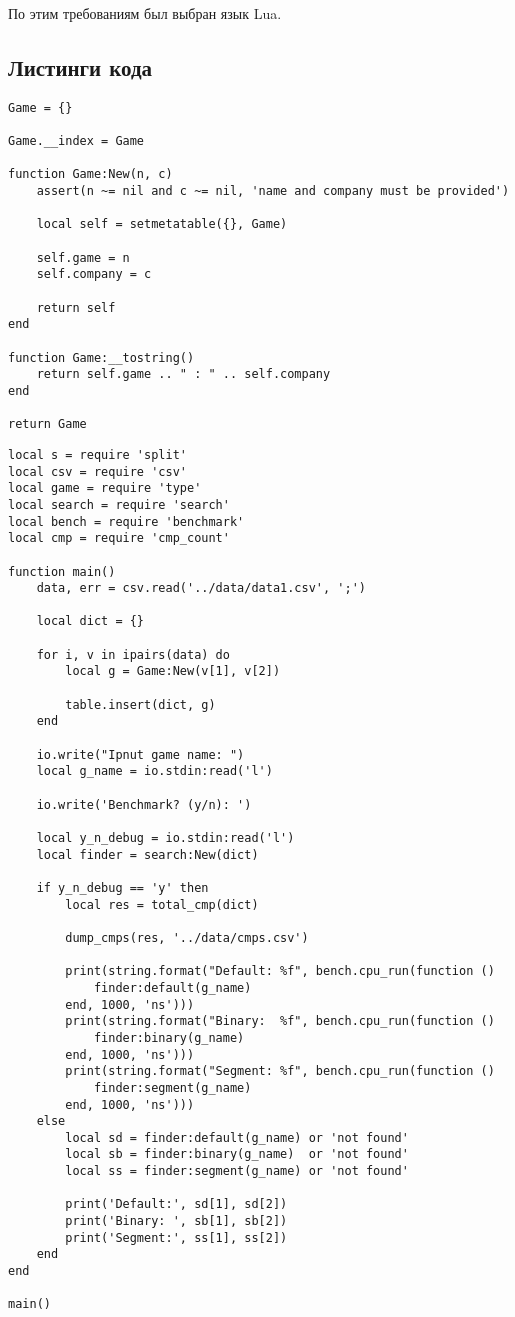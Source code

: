 По этим требованиям был выбран язык Lua.

\subsection{Листинги кода}


\begin{lstlisting}[caption=Словарь, label=list:matrix, language={}]
Game = {}

Game.__index = Game

function Game:New(n, c)
    assert(n ~= nil and c ~= nil, 'name and company must be provided')
    
    local self = setmetatable({}, Game)
    
    self.game = n
    self.company = c

    return self
end

function Game:__tostring()
    return self.game .. " : " .. self.company 
end
    
return Game
\end{lstlisting}

\begin{lstlisting}[caption=Точка входа, label=list:matrix, language={}]
local s = require 'split'
local csv = require 'csv'
local game = require 'type'
local search = require 'search'
local bench = require 'benchmark'
local cmp = require 'cmp_count'

function main()
    data, err = csv.read('../data/data1.csv', ';')

    local dict = {}

    for i, v in ipairs(data) do
        local g = Game:New(v[1], v[2])

        table.insert(dict, g)
    end

    io.write("Ipnut game name: ")
    local g_name = io.stdin:read('l')

    io.write('Benchmark? (y/n): ')

    local y_n_debug = io.stdin:read('l')
    local finder = search:New(dict)

    if y_n_debug == 'y' then
        local res = total_cmp(dict)

        dump_cmps(res, '../data/cmps.csv')

        print(string.format("Default: %f", bench.cpu_run(function ()
            finder:default(g_name)
        end, 1000, 'ns')))
        print(string.format("Binary:  %f", bench.cpu_run(function ()
            finder:binary(g_name)
        end, 1000, 'ns')))
        print(string.format("Segment: %f", bench.cpu_run(function ()
            finder:segment(g_name)
        end, 1000, 'ns')))
    else
        local sd = finder:default(g_name) or 'not found'
        local sb = finder:binary(g_name)  or 'not found'
        local ss = finder:segment(g_name) or 'not found'

        print('Default:', sd[1], sd[2])
        print('Binary: ', sb[1], sb[2])
        print('Segment:', ss[1], ss[2])
    end
end

main()
\end{lstlisting}

